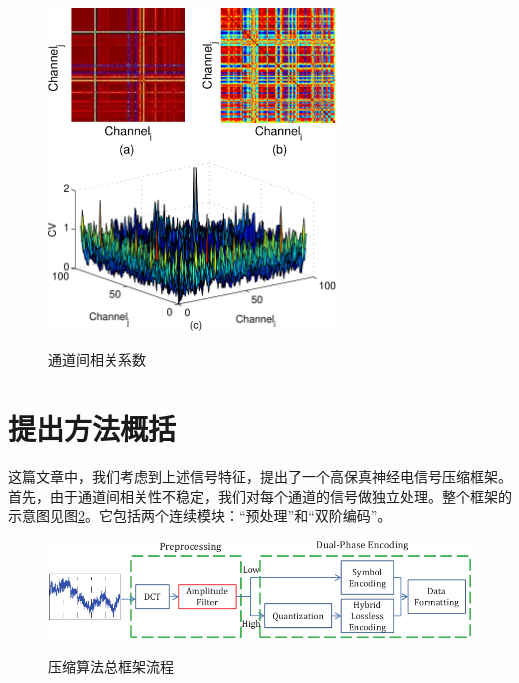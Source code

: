 \begin{figure}
  \centering
  \includegraphics[width=3in]{Pictures/Compression/f3(ab)-crop.pdf}\\
  \includegraphics[width=3in]{Pictures/Compression/f3(c)-crop.pdf}\\
  \caption{通道间相关系数}\label{fig:Characteristic3}
\end{figure}




\section{提出方法概括}
这篇文章中，我们考虑到上述信号特征，提出了一个高保真神经电信号压缩框架。首先，由于通道间相关性不稳定，我们对每个通道的信号做独立处理。整个框架的示意图见图\ref{Fig:Compression Algorithm Diagram}。它包括两个连续模块：“预处理”和“双阶编码”。

\begin{figure}
  \centering
  \includegraphics{Pictures/Compression/f4test1-crop.pdf}\\
  \caption{压缩算法总框架流程}\label{Fig:Compression Algorithm Diagram}
\end{figure}

